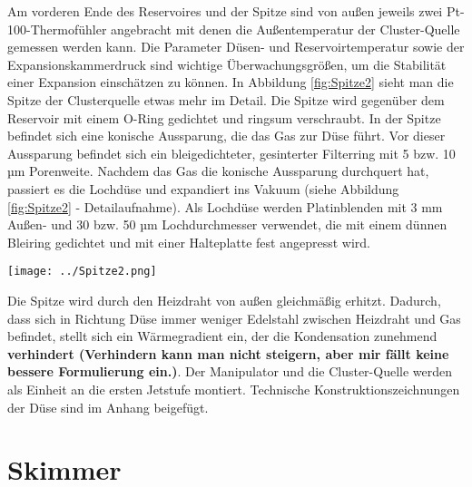 Am vorderen Ende des Reservoires und der Spitze sind von außen jeweils zwei Pt-100-Thermofühler angebracht mit denen die Außentemperatur der Cluster-Quelle gemessen werden kann. 
Die Parameter Düsen- und Reservoirtemperatur sowie der Expansionskammerdruck sind wichtige Überwachungsgrößen, um die Stabilität einer Expansion einschätzen zu können.
In Abbildung \ref{fig:Spitze2} sieht man die Spitze der Clusterquelle etwas mehr im Detail.
Die Spitze wird gegenüber dem Reservoir mit einem O-Ring gedichtet und ringsum verschraubt.
In der Spitze befindet sich eine konische Aussparung, die das Gas zur Düse führt. Vor dieser Aussparung befindet sich ein bleigedichteter, gesinterter Filterring mit 5 bzw. 10 µm Porenweite. Nachdem das Gas die konische Aussparung durchquert hat, passiert es die Lochdüse und expandiert ins Vakuum (siehe Abbildung \ref{fig:Spitze2} - Detailaufnahme). Als Lochdüse werden Platinblenden mit 3 mm Außen- und 30 bzw. 50 µm Lochdurchmesser verwendet, die mit einem dünnen Bleiring gedichtet und mit einer Halteplatte fest angepresst wird. %

\begin{center} 
\begin{minipage}{\linewidth}
\texttt{[image: ../Spitze2.png]}%
  \label{fig:Spitze2}
\end{minipage} 
\end{center} 

Die Spitze wird durch den Heizdraht von außen gleichmäßig erhitzt. Dadurch, dass sich in Richtung Düse immer weniger Edelstahl zwischen Heizdraht und Gas befindet, stellt sich ein Wärmegradient ein, der die Kondensation zunehmend \textbf{verhindert (Verhindern kann man nicht steigern, aber mir fällt keine bessere Formulierung ein.)}.
%
Der Manipulator und die Cluster-Quelle werden als Einheit an die ersten Jetstufe montiert. 
Technische Konstruktionszeichnungen der Düse sind im Anhang beigefügt.
%
%



\section{Skimmer} \label{sec:Skimmer}

